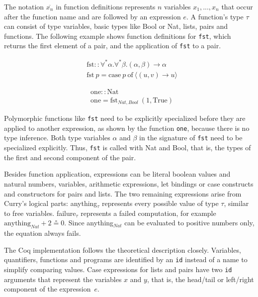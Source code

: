 \documentclass[paper = a4, fleqn, abstract=on, twoside]{scrreprt}
\newcommand{\coqinline}[1]{\texttt{#1}}
\begin{document}
\par
The notation $\overline{x_{n}}$ in function definitions represents $n$ variables $x_{1},...,x_{n}$ that occur after the function name and are followed by an expression $e$. A function's type $\tau$ can consist of type variables, basic types like Bool or Nat, lists, pairs and functions. The following example shows function definitions for \texttt{fst}, which returns the first element of a pair, and the application of \texttt{fst} to a pair.
\vspace*{-1em}
\begin{figure}[H]
	\begin{minipage}{.5 \linewidth}
		\begin{align*}
		&\text{fst}::\forall^{*}\alpha.\forall^{*}\beta.(\alpha, \beta) \rightarrow\alpha\\
		&\text{fst}\: p = \text{case}\: p\: \text{of}\: \langle(u,v) \rightarrow u\rangle
		\end{align*}
	\end{minipage}
	\begin{minipage}{.5 \linewidth}
		\begin{align*}
		&\text{one} :: \text{Nat}\\
		&\text{one} = \text{fst}_{Nat, Bool} ~ (1, \text{True})
		\end{align*}
	\end{minipage}
\end{figure}\noindent
Polymorphic functions like \texttt{fst} need to be explicitly specialized before they are applied to another expression, as shown by the function \texttt{one}, because there is no type inference. Both type variables $\alpha$ and $\beta$ in the signature of \texttt{fst} need to be specialized explicitly. Thus, \texttt{fst} is called with Nat and Bool, that is, the types of the first and second component of the pair.
\par
Besides function application, expressions can be literal boolean values and natural numbers, variables, arithmetic expressions, let bindings or case constructs and constructors for pairs and lists. The two remaining expressions arise from Curry's logical parts: anything$_{\tau}$ represents every possible value of type $\tau$, similar to free variables. failure$_{\tau}$ represents a failed computation, for example $\text{anything}_{Nat} + 2 \circeq 0$. Since anything$_{Nat}$ can be evaluated to positive numbers only, the equation always fails.
\par
The Coq implementation follows the theoretical description closely. Variables, quantifiers, functions and programs are identified by an \coqinline{id} instead of a name to simplify comparing values. Case expressions for lists and pairs have two \coqinline{id} arguments that represent the variables $x$ and $y$, that is, the head/tail or left/right component of the \mbox{expression $e$}.
\end{document}
